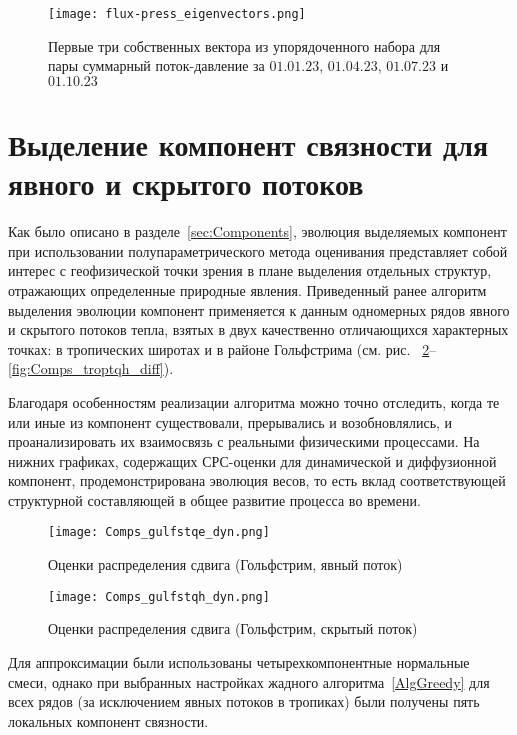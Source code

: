 \begin{figure}
	\centering
	\texttt{[image: flux-press\_eigenvectors.png]}
	\caption{Первые три собственных вектора из упорядоченного набора для пары суммарный поток-давление за $01.01.23$, $01.04.23$, $01.07.23$ и $01.10.23$}
	\label{fig:Flux-press_eigenvectors}
\end{figure}

\section{Выделение компонент связности для явного и скрытого потоков}
\label{sec:ComponentsExamples}
Как было описано в разделе~\ref{sec:Components}, эволюция выделяемых компонент при использовании полупараметрического метода оценивания представляет собой интерес с геофизической точки зрения в плане выделения отдельных структур, отражающих определенные природные явления. Приведенный ранее алгоритм выделения эволюции компонент применяется к данным одномерных рядов явного и скрытого потоков тепла, взятых в двух качественно отличающихся характерных точках: в тропических широтах и в районе Гольфстрима (см. рис. ~\ref{fig:Comps_gulfstqe_dyn}--\ref{fig:Comps_troptqh_diff}).


Благодаря особенностям реализации алгоритма можно точно отследить, когда те или иные из компонент существовали, прерывались и возобновлялись, и проанализировать их взаимосвязь с реальными физическими процессами. На нижних графиках, содержащих СРС-оценки для динамической и диффузионной компонент, продемонстрирована эволюция весов, то есть вклад соответствующей структурной составляющей в общее развитие процесса во времени.

\begin{figure}[!h]
	\centering
	\texttt{[image: Comps\_gulfstqe\_dyn.png]}
	\caption{Оценки распределения сдвига (Гольфстрим, явный поток)}
	\label{fig:Comps_gulfstqe_dyn}
\end{figure}

\begin{figure}[!h]
	\centering
	\texttt{[image: Comps\_gulfstqh\_dyn.png]}
	\caption{Оценки распределения сдвига (Гольфстрим, скрытый поток)}
	\label{fig:Comps_gulfstqh_dyn}
\end{figure}

Для аппроксимации были использованы четырехкомпонентные нормальные смеси, однако при выбранных настройках жадного алгоритма~\ref{AlgGreedy} для всех рядов (за исключением явных потоков в тропиках) были получены пять локальных компонент связности.

